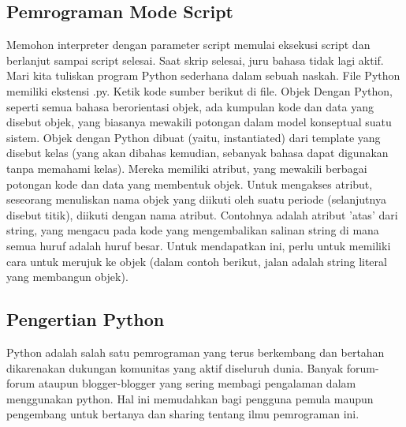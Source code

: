 \subsection{Pemrograman Mode Script}
Memohon interpreter dengan parameter script memulai eksekusi script dan berlanjut sampai script selesai. Saat skrip selesai, juru bahasa tidak lagi aktif. Mari kita tuliskan program Python sederhana dalam sebuah naskah. File Python memiliki ekstensi .py. Ketik kode sumber berikut di ﬁle.
Objek Dengan Python, seperti semua bahasa berorientasi objek, ada kumpulan kode dan data yang disebut objek, yang biasanya mewakili potongan dalam model konseptual suatu sistem. Objek dengan Python dibuat (yaitu, instantiated) dari template yang disebut kelas (yang akan dibahas kemudian, sebanyak bahasa dapat digunakan tanpa memahami kelas). Mereka memiliki atribut, yang mewakili berbagai potongan kode dan data yang membentuk objek. Untuk mengakses atribut, seseorang menuliskan nama objek yang diikuti oleh suatu periode (selanjutnya disebut titik), diikuti dengan nama atribut.
Contohnya adalah atribut ’atas’ dari string, yang mengacu pada kode yang mengembalikan salinan string di mana semua huruf adalah huruf besar. Untuk mendapatkan ini, perlu untuk memiliki cara untuk merujuk ke objek (dalam contoh berikut, jalan adalah string literal yang membangun objek).

\subsection{Pengertian Python}
Python adalah salah satu pemrograman yang terus berkembang dan bertahan dikarenakan dukungan komunitas yang aktif diseluruh dunia. Banyak forum-forum ataupun blogger-blogger yang sering membagi pengalaman dalam menggunakan python. Hal ini memudahkan bagi pengguna pemula maupun pengembang untuk bertanya dan sharing tentang ilmu pemrograman ini. 

